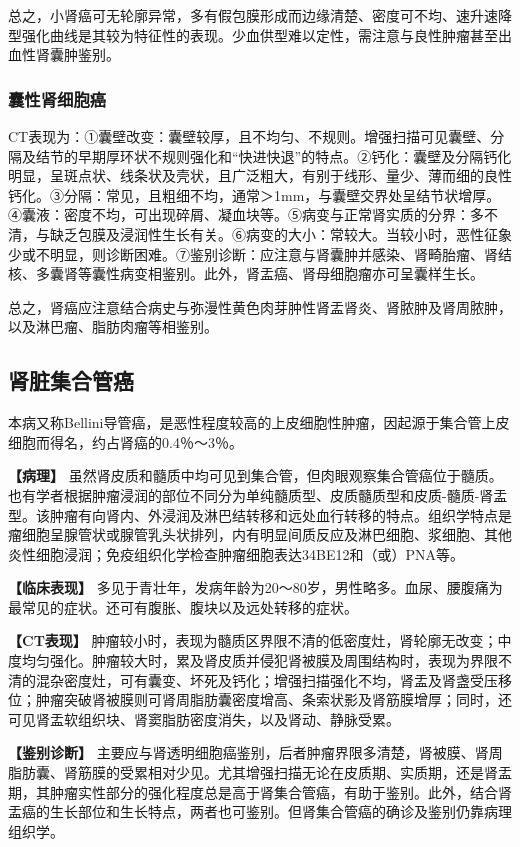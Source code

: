 总之，小肾癌可无轮廓异常，多有假包膜形成而边缘清楚、密度可不均、速升速降型强化曲线是其较为特征性的表现。少血供型难以定性，需注意与良性肿瘤甚至出血性肾囊肿鉴别。

\subsubsection{囊性肾细胞癌}

CT表现为：①囊壁改变：囊壁较厚，且不均匀、不规则。增强扫描可见囊壁、分隔及结节的早期厚环状不规则强化和“快进快退”的特点。②钙化：囊壁及分隔钙化明显，呈斑点状、线条状及壳状，且广泛粗大，有别于线形、量少、薄而细的良性钙化。③分隔：常见，且粗细不均，通常＞1mm，与囊壁交界处呈结节状增厚。④囊液：密度不均，可出现碎屑、凝血块等。⑤病变与正常肾实质的分界：多不清，与缺乏包膜及浸润性生长有关。⑥病变的大小：常较大。当较小时，恶性征象少或不明显，则诊断困难。⑦鉴别诊断：应注意与肾囊肿并感染、肾畸胎瘤、肾结核、多囊肾等囊性病变相鉴别。此外，肾盂癌、肾母细胞瘤亦可呈囊样生长。

总之，肾癌应注意结合病史与弥漫性黄色肉芽肿性肾盂肾炎、肾脓肿及肾周脓肿，以及淋巴瘤、脂肪肉瘤等相鉴别。

\subsection{肾脏集合管癌}

本病又称Bellini导管癌，是恶性程度较高的上皮细胞性肿瘤，因起源于集合管上皮细胞而得名，约占肾癌的0.4％～3％。

\textbf{【病理】}
虽然肾皮质和髓质中均可见到集合管，但肉眼观察集合管癌位于髓质。也有学者根据肿瘤浸润的部位不同分为单纯髓质型、皮质髓质型和皮质-髓质-肾盂型。该肿瘤有向肾内、外浸润及淋巴结转移和远处血行转移的特点。组织学特点是瘤细胞呈腺管状或腺管乳头状排列，内有明显间质反应及淋巴细胞、浆细胞、其他炎性细胞浸润；免疫组织化学检查肿瘤细胞表达34BE12和（或）PNA等。

\textbf{【临床表现】}
多见于青壮年，发病年龄为20～80岁，男性略多。血尿、腰腹痛为最常见的症状。还可有腹胀、腹块以及远处转移的症状。

\textbf{【CT表现】}
肿瘤较小时，表现为髓质区界限不清的低密度灶，肾轮廓无改变；中度均匀强化。肿瘤较大时，累及肾皮质并侵犯肾被膜及周围结构时，表现为界限不清的混杂密度灶，可有囊变、坏死及钙化；增强扫描强化不均，肾盂及肾盏受压移位；肿瘤突破肾被膜则可肾周脂肪囊密度增高、条索状影及肾筋膜增厚；同时，还可见肾盂软组织块、肾窦脂肪密度消失，以及肾动、静脉受累。

\textbf{【鉴别诊断】}
主要应与肾透明细胞癌鉴别，后者肿瘤界限多清楚，肾被膜、肾周脂肪囊、肾筋膜的受累相对少见。尤其增强扫描无论在皮质期、实质期，还是肾盂期，其肿瘤实性部分的强化程度总是高于肾集合管癌，有助于鉴别。此外，结合肾盂癌的生长部位和生长特点，两者也可鉴别。但肾集合管癌的确诊及鉴别仍靠病理组织学。

